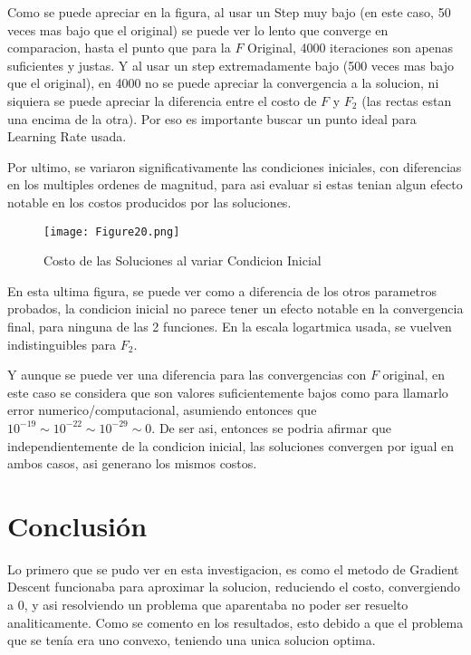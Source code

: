 \documentclass{article}
\begin{document}
\noindent Como se puede apreciar en la figura, al usar un Step muy bajo (en este caso, 50 veces mas bajo que el original) se puede ver lo lento que converge en comparacion, hasta el punto que para la $F$ Original, 4000 iteraciones son apenas suficientes y justas. Y al usar un step extremadamente bajo (500 veces mas bajo que el original), en 4000 no se puede apreciar la convergencia a la solucion, ni siquiera se puede apreciar la diferencia entre el costo de $F$ y $F_2$ (las rectas estan una encima de la otra). Por eso es importante buscar un punto ideal para Learning Rate usada. \vspace{\baselineskip}

\noindent Por ultimo, se variaron significativamente las condiciones iniciales, con diferencias en los multiples ordenes de magnitud, para asi evaluar si estas tenian algun efecto notable en los costos producidos por las soluciones. 
\vspace{15\baselineskip}

\begin{figure}[ht]
    \centering
    \caption{Costo de las Soluciones al variar Condicion Inicial}
    \texttt{[image: Figure20.png]}
    \label{fig:Image 1}
\end{figure}

\noindent En esta ultima figura, se puede ver como a diferencia de los otros parametros probados, la condicion inicial no parece tener un efecto notable en la convergencia final, para ninguna de las 2 funciones. En la escala logartmica usada, se vuelven indistinguibles para $F_2$. 
\vspace{\baselineskip}

\noindent Y aunque se puede ver una diferencia para las convergencias con $F$ original, en este caso se considera que son valores suficientemente bajos como para llamarlo error numerico/computacional, asumiendo entonces que $10^{-19} \sim 10^{-22} \sim 10^{-29} \sim 0$. De ser asi, entonces se podria afirmar que independientemente de la condicion inicial, las soluciones convergen por igual en ambos casos, asi generano los mismos costos. 



\vspace{20\baselineskip}


\section*{Conclusión}


\noindent Lo primero que se pudo ver en esta investigacion, es como el metodo de Gradient Descent funcionaba para aproximar la solucion, reduciendo el costo, convergiendo a $0$, y asi resolviendo un problema que aparentaba no poder ser resuelto analiticamente. Como se comento en los resultados, esto debido a que el problema que se tenía era uno convexo, teniendo una unica solucion optima. \vspace{\baselineskip}
\end{document}
